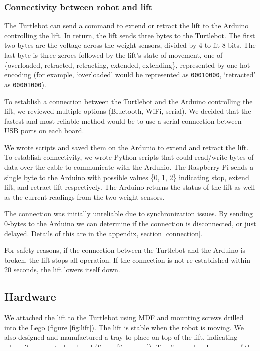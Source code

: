 \documentclass{article}
\begin{document}
\subsubsection{Connectivity between robot and lift}
The Turtlebot can send a command to extend or retract the lift to the Arduino controlling the lift. In return, the lift sends three bytes to the Turtlebot. The first two bytes are the voltage across the weight sensors, divided by 4 to fit 8 bits. The last byte is three zeroes followed by the lift's state of movement, one of \{overloaded, retracted, retracting, extended, extending\}, represented by one-hot encoding (for example, `overloaded' would be represented as {\tt 00010000}, `retracted' as {\tt 00001000}). 

To establish a connection between the Turtlebot and the Arduino controlling the lift, we reviewed multiple options (Bluetooth, WiFi, serial). We decided that the fastest and most reliable method would be to use a serial connection between USB ports on each board.

We wrote scripts and saved them on the Ardunio to extend and retract the lift. To establish connectivity, we wrote Python scripts that could read/write bytes of data over the cable to communicate with the Ardunio. The Raspberry Pi sends a single byte to the Arduino with possible values \{0, 1, 2\} indicating stop, extend lift, and retract lift respectively. The Arduino returns the status of the lift as well as the current readings from the two weight sensors.

The connection was initially unreliable due to synchronization issues. By sending 0-bytes to the Arduino we can determine if the connection is disconnected, or just delayed. Details of this are in the appendix, section \ref{connection}.

For safety reasons, if the connection between the Turtlebot and the Arduino is broken, the lift stops all operation. If the connection is not re-established within 20 seconds, the lift lowers itself down.  

\subsection{Hardware}
We attached the lift to the Turtlebot using MDF and mounting screws drilled into the Lego (figure \ref{fig:lift}). The lift is stable when the robot is moving. We also designed and manufactured a tray to place on top of the lift, indicating where items are to be placed (figure \ref{fig:sensor}). The figure also shows one of the weight sensors. We placed two weight sensors under the tray: these can be used to detect when deliveries have been placed and picked up on the robot. The weight sensors send voltage values to the Arduino, which are sent forward to the Turtlebot for interpretation. We intended to do testing to determine how best to interpret the weight sensor values but were not able to do this before the team moved to remote working. 
\end{document}
